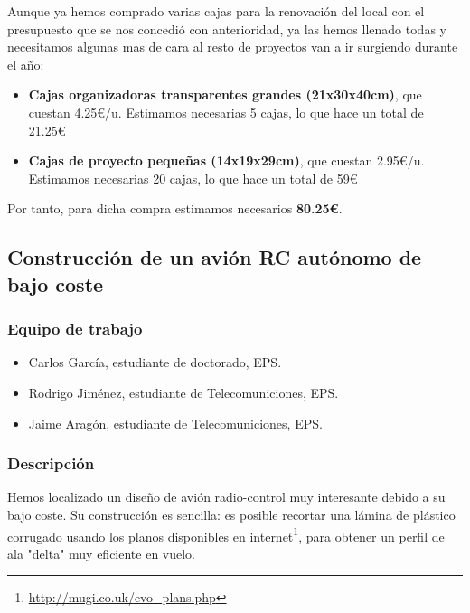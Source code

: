 \documentclass[12pt,twoside]{report}
\begin{document}
Aunque ya hemos comprado varias cajas para la renovación del local con el presupuesto que se nos concedió con anterioridad, ya las hemos llenado todas y necesitamos algunas mas de cara al resto de proyectos van a ir surgiendo durante el año:

\begin{itemize}
\item \textbf{Cajas organizadoras transparentes grandes (21x30x40cm)}, que cuestan 4.25\euro{}/u. Estimamos necesarias 5 cajas, lo que hace un total de 21.25\euro{}
\item \textbf{Cajas de proyecto pequeñas (14x19x29cm)}, que cuestan 2.95\euro{}/u. Estimamos necesarias 20 cajas, lo que hace un total de 59\euro{}
\end{itemize}

Por tanto, para dicha compra estimamos necesarios \textbf{80.25\euro{}}.




\subsection{Construcción de un avión RC autónomo de bajo coste}

\subsubsection{Equipo de trabajo}
\begin{itemize}
\item Carlos García, estudiante de doctorado, EPS.
\item Rodrigo Jiménez, estudiante de Telecomuniciones, EPS.
\item Jaime Aragón, estudiante de Telecomuniciones, EPS.
\end{itemize}
\subsubsection{Descripción}
Hemos localizado un diseño de avión radio-control muy interesante debido a su bajo coste. Su construcción es sencilla: es posible recortar una lámina de plástico corrugado usando los planos disponibles en internet\footnote{\url{http://mugi.co.uk/evo_plans.php}}, para obtener un perfil de ala "delta" muy eficiente en vuelo.
\end{document}
